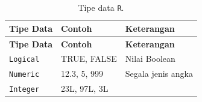 \documentclass[12pt,]{krantz}
\begin{document}
\begin{longtable}[]{@{}lll@{}}
\caption{\label{tab:tipedata} Tipe data \texttt{R}.}\tabularnewline
\toprule
\begin{minipage}[b]{0.11\columnwidth}\raggedright
\textbf{Tipe Data}\strut
\end{minipage} & \begin{minipage}[b]{0.19\columnwidth}\raggedright
\textbf{Contoh}\strut
\end{minipage} & \begin{minipage}[b]{0.61\columnwidth}\raggedright
\textbf{Keterangan}\strut
\end{minipage}\tabularnewline
\midrule
\endfirsthead
\toprule
\begin{minipage}[b]{0.11\columnwidth}\raggedright
\textbf{Tipe Data}\strut
\end{minipage} & \begin{minipage}[b]{0.19\columnwidth}\raggedright
\textbf{Contoh}\strut
\end{minipage} & \begin{minipage}[b]{0.61\columnwidth}\raggedright
\textbf{Keterangan}\strut
\end{minipage}\tabularnewline
\midrule
\endhead
\begin{minipage}[t]{0.11\columnwidth}\raggedright
\texttt{Logical}\strut
\end{minipage} & \begin{minipage}[t]{0.19\columnwidth}\raggedright
TRUE, FALSE\strut
\end{minipage} & \begin{minipage}[t]{0.61\columnwidth}\raggedright
Nilai Boolean\strut
\end{minipage}\tabularnewline
\begin{minipage}[t]{0.11\columnwidth}\raggedright
\texttt{Numeric}\strut
\end{minipage} & \begin{minipage}[t]{0.19\columnwidth}\raggedright
12.3, 5, 999\strut
\end{minipage} & \begin{minipage}[t]{0.61\columnwidth}\raggedright
Segala jenis angka\strut
\end{minipage}\tabularnewline
\begin{minipage}[t]{0.11\columnwidth}\raggedright
\texttt{Integer}\strut
\end{minipage} & \begin{minipage}[t]{0.19\columnwidth}\raggedright
23L, 97L, 3L\strut
\end{minipage} & \begin{minipage}[t]{0.61\columnwidth}\raggedright

\end{minipage}
\end{longtable}
\end{document}
